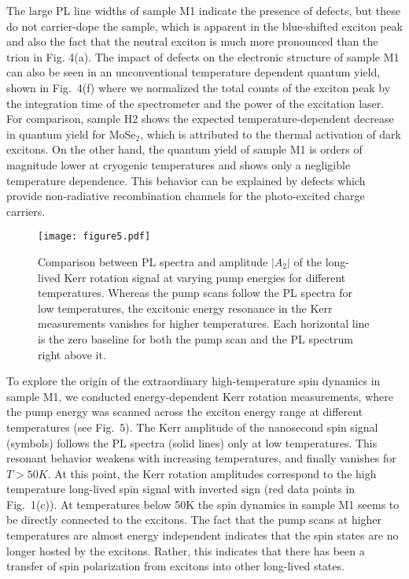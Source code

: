 \documentclass[prb,aps,superscriptaddress,reprint]{revtex4-1}
\begin{document}
The large PL line widths of sample M1 indicate the presence of defects, but these do not carrier-dope the sample, which is apparent in the blue-shifted exciton peak and also the fact that the neutral exciton is much more pronounced than the trion in Fig. 4(a). The impact of defects on the electronic structure of sample M1 can also be seen in an unconventional temperature dependent quantum yield, shown in Fig.~4(f) where we normalized the total counts of the exciton peak by the integration time of the spectrometer and the power of the excitation laser. For comparison, sample H2 shows the expected temperature-dependent decrease in quantum yield for MoSe$_2$, which is attributed to the thermal activation of dark excitons.\cite{NatureCommunications.6.10110,arXiv180500127} On the other hand, the quantum yield of sample M1 is orders of magnitude lower at cryogenic temperatures and shows only a negligible temperature dependence. This behavior can be explained by defects which provide non-radiative recombination channels for the photo-excited charge carriers.\cite{arXiv180500127}

\begin{figure}[tb]
		\texttt{[image: figure5.pdf]}
	\caption{Comparison between PL spectra and amplitude $|A_2|$ of the long-lived Kerr rotation signal at varying pump energies for different temperatures. Whereas the pump scans follow the PL spectra for low temperatures, the excitonic energy resonance in the Kerr measurements vanishes for higher temperatures. Each horizontal line is the zero baseline for both the pump scan and the PL spectrum right above it.}
	\label{figure5}
\end{figure}

To explore the origin of the extraordinary high-temperature spin dynamics in sample M1, we conducted energy-dependent Kerr rotation measurements, where   the pump energy was scanned across the exciton energy range at different temperatures (see Fig.~5). The Kerr amplitude of the nanosecond spin signal (symbols) follows the PL spectra (solid lines) only at low temperatures. This resonant behavior weakens with increasing temperatures, and finally vanishes for $T>\unit{50}{K}$. At this point, the Kerr rotation amplitudes correspond to the high temperature long-lived spin signal with inverted sign (red data points in Fig.~1(c)). At temperatures below \unit{50}{K} the spin dynamics in sample M1 seems to be directly connected to the excitons. The fact that the pump scans at higher temperatures are almost energy independent indicates that the spin states are no longer hosted by the excitons. Rather, this indicates that there has been a transfer of spin polarization from excitons into other long-lived states. 
\end{document}
